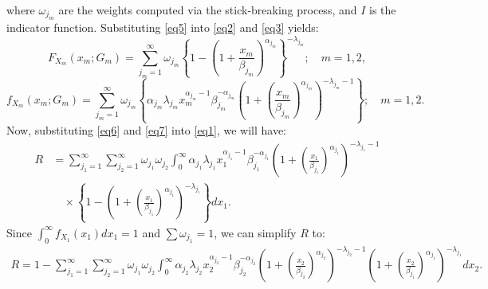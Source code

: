 \documentclass[twoside]{article}
\begin{document}
where \(\omega_{j_m}\) are the weights computed via the stick-breaking process, and \(I\) is the indicator function.
 Substituting \eqref{eq5} into \eqref{eq2} and \eqref{eq3} yields:
\begin{equation}\label{eq6}
F_{X_m}(x_m; G_m) = \sum_{j_m=1}^{\infty} \omega_{j_m} \left\{1 - \left(1 + \frac{x_m}{\beta_{j_m}}\right)^{\alpha_{j_m}}\right\}^{-\lambda_{j_m}}; \quad m = 1, 2,
\end{equation}
\begin{equation}\label{eq7}
f_{X_m}(x_m; G_m) = \sum_{j_m=1}^{\infty} \omega_{j_m} \left\{\alpha_{j_m} \lambda_{j_m} x_m^{\alpha_{j_m}-1} \beta_{j_m}^{-\alpha_{j_m}} \left(1 + \left(\frac{x_m}{\beta_{j_m}}\right)^{\alpha_{j_m}}\right)^{-\lambda_{j_m}-1}\right\}; \quad m = 1, 2.
\end{equation}
Now, substituting \eqref{eq6} and \eqref{eq7} into \eqref{eq1}, we will have:
\[
\begin{aligned}
R &= \sum_{j_1=1}^{\infty} \sum_{j_2=1}^{\infty} \omega_{j_1} \omega_{j_2} \int_0^\infty \alpha_{j_1} \lambda_{j_1} x_1^{\alpha_{j_1}-1} \beta_{j_1}^{-\alpha_{j_1}} \left(1 + \left(\frac{x_1}{\beta_{j_1}}\right)^{\alpha_{j_1}}\right)^{-\lambda_{j_1}-1} \\
&\quad \times \left\{1 - \left(1 + \left(\frac{x_1}{\beta_{j_1}}\right)^{\alpha_{j_1}}\right)^{-\lambda_{j_1}} \right\} dx_1. \tag{7}
\end{aligned}
\]
Since \(\int_0^\infty f_{X_1}(x_1) dx_1 = 1\) and \(\sum \omega_{j_1} = 1\), we can simplify \(R\) to:
\begin{align}\label{eq8}
R = 1 - \sum_{j_1=1}^{\infty} \sum_{j_2=1}^{\infty} \omega_{j_1} \omega_{j_2} \int_0^\infty \alpha_{j_2} \lambda_{j_2} x_2^{\alpha_{j_2}-1} \beta_{j_2}^{-\alpha_{j_2}} \left(1 + \left(\frac{x_2}{\beta_{j_2}}\right)^{\alpha_{j_2}}\right)^{-\lambda_{j_2}-1} \left(1 + \left(\frac{x_2}{\beta_{j_1}}\right)^{\alpha_{j_1}}\right)^{-\lambda_{j_1}} dx_2.
\end{align}
\end{document}
